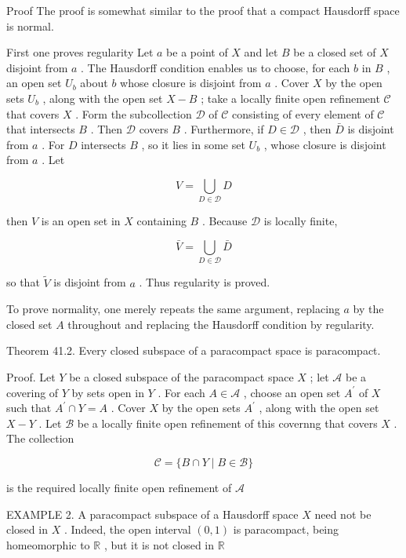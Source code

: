 \documentclass[10pt]{article}
\begin{document}
Proof The proof is somewhat similar to the proof that a compact Hausdorff space is normal.

First one proves regularity Let \(a\) be a point of \(X\) and let \(B\) be a closed set of \(X\) disjoint from \(a\) . The Hausdorff condition enables us to choose, for each \(b\) in \(B\) , an open set \({U}_{b}\) about \(b\) whose closure is disjoint from \(a\) . Cover \(X\) by the open sets \({U}_{b}\) , along with the open set \(X - B\) ; take a locally finite open refinement \(\mathcal{C}\) that covers \(X\) . Form the subcollection \(\mathcal{D}\) of \(\mathcal{C}\) consisting of every element of \(\mathcal{C}\) that intersects \(B\) . Then \(\mathcal{D}\) covers \(B\) . Furthermore, if \(D \in  \mathcal{D}\) , then \(\bar{D}\) is disjoint from \(a\) . For \(D\) intersects \(B\) , so it lies in some set \({U}_{b}\) , whose closure is disjoint from \(a\) . Let

\[
V = \mathop{\bigcup }\limits_{{D \in  \mathcal{D}}}D
\]

then \(V\) is an open set in \(X\) containing \(B\) . Because \(\mathcal{D}\) is locally finite,

\[
\bar{V} = \mathop{\bigcup }\limits_{{D \in  \mathcal{D}}}\bar{D}
\]

so that \(\widetilde{V}\) is disjoint from \(a\) . Thus regularity is proved.

To prove normality, one merely repeats the same argument, replacing \(a\) by the closed set \(A\) throughout and replacing the Hausdorff condition by regularity.

Theorem 41.2. Every closed subspace of a paracompact space is paracompact.

Proof. Let \(Y\) be a closed subspace of the paracompact space \(X\) ; let \(\mathcal{A}\) be a covering of \(Y\) by sets open in \(Y\) . For each \(A \in  \mathcal{A}\) , choose an open set \({A}^{\prime }\) of \(X\) such that \({A}^{\prime } \cap  Y = A\) . Cover \(X\) by the open sets \({A}^{\prime }\) , along with the open set \(X - Y\) . Let \(\mathcal{B}\) be a locally finite open refinement of this covernng that covers \(X\) . The collection

\[
\mathcal{C} = \{ B \cap  Y \mid  B \in  \mathcal{B}\}
\]

is the required locally finite open refinement of \(\mathcal{A}\)

EXAMPLE 2. A paracompact subspace of a Hausdorff space \(X\) need not be closed in \(X\) . Indeed, the open interval \(\left( {0,1}\right)\) is paracompact, being homeomorphic to \(\mathbb{R}\) , but it is not closed in \(\mathbb{R}\)
\end{document}

